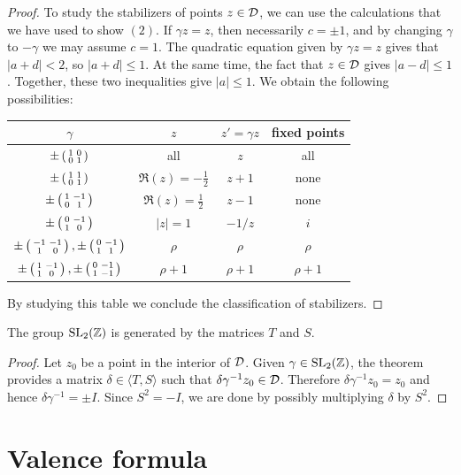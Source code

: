 \begin{proof}
To study the stabilizers of points $z\in\mathcal{D}$, we can use the calculations that we have used to show $(2)$. If $\gamma z = z$, then necessarily $c=\pm 1$, and by changing $\gamma$ to $-\gamma$ we may assume $c=1$. The quadratic equation given by $\gamma z = z$ gives that $|a+d|<2$, so $|a+d|\leq 1$. At the same time, the fact that $z\in\mathcal{D}$ gives $|a-d|\leq 1$. Together, these two inequalities give $|a|\leq 1$. We obtain the following possibilities:
\begin{table}[h]
\begin{tabular}{cccc}
\toprule
$\gamma$&$z$&$z'=\gamma z$&fixed points\\
\midrule
$\pm \left(\begin{smallmatrix}1&0\\0&1\end{smallmatrix}\right)$&all&$z$&all\\[5pt]
$\pm \left(\begin{smallmatrix}1&1\\0&1\end{smallmatrix}\right)$&$\Re(z)=-\frac 12$&$z+1$&none\\[5pt]
$\pm \left(\begin{smallmatrix}1&-1\\0&1\end{smallmatrix}\right)$&$\Re(z)=\frac 12$&$z-1$&none\\[5pt]
$\pm \left(\begin{smallmatrix}0&-1\\1&0\end{smallmatrix}\right)$&$|z|=1$&$-1/z$&$i$\\[5pt]
$\pm \left(\begin{smallmatrix}-1&-1\\1&0\end{smallmatrix}\right),\pm \left(\begin{smallmatrix}0&-1\\1&1\end{smallmatrix}\right)$&$\rho$&$\rho$&$\rho$\\[5pt]
$\pm \left(\begin{smallmatrix}1&-1\\1&0\end{smallmatrix}\right),\pm \left(\begin{smallmatrix}0&-1\\1&-1\end{smallmatrix}\right)$&$\rho+1$&$\rho+1$&$\rho+1$
\end{tabular}
\end{table}
By studying this table we conclude the classification of stabilizers.
\end{proof}
\begin{corollary}
\label{cor:STgenerate}
  The group $\operatorname{SL}_2(\mathbb{Z})$ is generated by the matrices $T$ and $S$.
\end{corollary}
\begin{proof}
  Let $z_0$ be a point in the interior of $\mathcal{D}$. Given $\gamma\in\operatorname{SL}_2(\mathbb{Z})$, the theorem provides a matrix $\delta\in\langle T,S\rangle$ such that $\delta\gamma^{-1} z_0\in\mathcal{D}$. Therefore $\delta\gamma^{-1} z_0 = z_0$ and hence $\delta\gamma^{-1} = \pm I$. Since $S^2=-I$, we are done by possibly multiplying $\delta$ by $S^2$.
\end{proof}

\section{Valence formula}
\label{sec:valence-formula}

